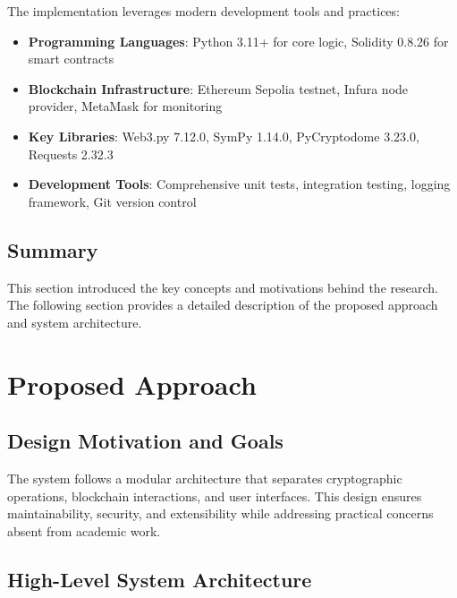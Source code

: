 \documentclass[12pt,a4paper]{article}
\begin{document}
The implementation leverages modern development tools and practices:

\begin{itemize}[leftmargin=15pt]
    \item \textbf{Programming Languages}: Python 3.11+ for core logic, Solidity 0.8.26 for smart contracts
    \item \textbf{Blockchain Infrastructure}: Ethereum Sepolia testnet, Infura node provider, MetaMask for monitoring
    \item \textbf{Key Libraries}: Web3.py 7.12.0, SymPy 1.14.0, PyCryptodome 3.23.0, Requests 2.32.3
    \item \textbf{Development Tools}: Comprehensive unit tests, integration testing, logging framework, Git version control
\end{itemize}

\subsection{Summary}

This section introduced the key concepts and motivations behind the research. The following section provides a detailed description of the proposed approach and system architecture.
\clearpage
\section{Proposed Approach}
\subsection{Design Motivation and Goals}

The system follows a modular architecture that separates cryptographic operations, blockchain interactions, and user interfaces. This design ensures maintainability, security, and extensibility while addressing practical concerns absent from academic work.

\subsection{High-Level System Architecture}
\end{document}
